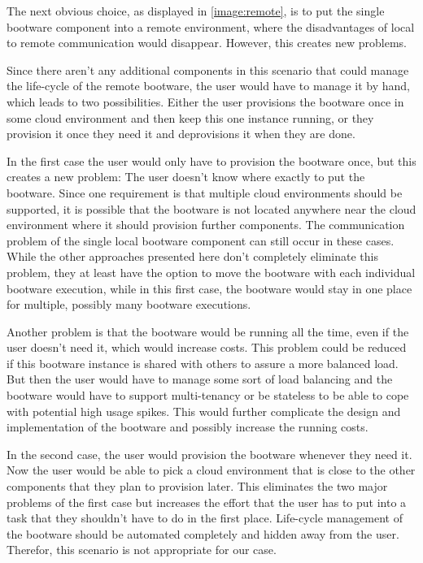 The next obvious choice, as displayed in \autoref{image:remote}, is to put the single bootware component into a remote environment, where the disadvantages of local to remote communication would disappear.
However, this creates new problems.

Since there aren't any additional components in this scenario that could manage the life-cycle of the remote bootware, the user would have to manage it by hand, which leads to two possibilities.
Either the user provisions the bootware once in some cloud environment and then keep this one instance running, or they provision it once they need it and deprovisions it when they are done.

In the first case the user would only have to provision the bootware once, but this creates a new problem: The user doesn't know where exactly to put the bootware.
Since one requirement is that multiple cloud environments should be supported, it is possible that the bootware is not located anywhere near the cloud environment where it should provision further components.
The communication problem of the single local bootware component can still occur in these cases.
While the other approaches presented here don't completely eliminate this problem, they at least have the option to move the bootware with each individual bootware execution, while in this first case, the bootware would stay in one place for multiple, possibly many bootware executions.

Another problem is that the bootware would be running all the time, even if the user doesn't need it, which would increase costs.
This problem could be reduced if this bootware instance is shared with others to assure a more balanced load.
But then the user would have to manage some sort of load balancing and the bootware would have to support multi-tenancy or be stateless to be able to cope with potential high usage spikes.
This would further complicate the design and implementation of the bootware and possibly increase the running costs.

In the second case, the user would provision the bootware whenever they need it. Now the user would be able to pick a cloud environment that is close to the other components that they plan to provision later.
This eliminates the two major problems of the first case but increases the effort that the user has to put into a task that they shouldn't have to do in the first place.
Life-cycle management of the bootware should be automated completely and hidden away from the user.
Therefor, this scenario is not appropriate for our case.

